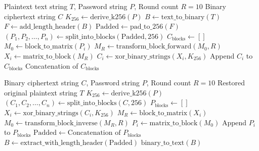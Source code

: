\begin{algorithm}[htbp]
\caption{SHA-512 256-Bit Block CA Encryption Pipeline}
\label{alg:research_encrypt}
\begin{algorithmic}[1]
\REQUIRE Plaintext text string $T$, Password string $P$, Round count $R=10$
\ENSURE Binary ciphertext string $C$
\STATE $K_{256} \leftarrow \text{derive\_k256}(P)$
\STATE $B \leftarrow \text{text\_to\_binary}(T)$
\STATE $F \leftarrow \text{add\_length\_header}(B)$
\STATE $\text{Padded} \leftarrow \text{pad\_to\_256}(F)$
\STATE $(P_1, P_2, \dots, P_n) \leftarrow \text{split\_into\_blocks}(\text{Padded}, 256)$
\STATE $C_{\text{blocks}} \leftarrow []$
    \STATE $M_0 \leftarrow \text{block\_to\_matrix}(P_i)$
    \STATE $M_R \leftarrow \text{transform\_block\_forward}(M_0, R)$
    \STATE $X_i \leftarrow \text{matrix\_to\_block}(M_R)$
    \STATE $C_i \leftarrow \text{xor\_binary\_strings}(X_i, K_{256})$
    \STATE Append $C_i$ to $C_{\text{blocks}}$
\ENDFOR
\RETURN Concatenation of $C_{\text{blocks}}$
\end{algorithmic}
\end{algorithm}

\begin{algorithm}[htbp]
\caption{SHA-512 256-Bit Block CA Decryption Pipeline}
\label{alg:research_decrypt}
\begin{algorithmic}[1]
\REQUIRE Binary ciphertext string $C$, Password string $P$, Round count $R=10$
\ENSURE Restored original plaintext string $T$
\STATE $K_{256} \leftarrow \text{derive\_k256}(P)$
\STATE $(C_1, C_2, \dots, C_n) \leftarrow \text{split\_into\_blocks}(C, 256)$
\STATE $P_{\text{blocks}} \leftarrow []$
    \STATE $X_i \leftarrow \text{xor\_binary\_strings}(C_i, K_{256})$
    \STATE $M_R \leftarrow \text{block\_to\_matrix}(X_i)$
    \STATE $M_0 \leftarrow \text{transform\_block\_inverse}(M_R, R)$
    \STATE $P_i \leftarrow \text{matrix\_to\_block}(M_0)$
    \STATE Append $P_i$ to $P_{\text{blocks}}$
\ENDFOR
\STATE $\text{Padded} \leftarrow \text{Concatenation of } P_{\text{blocks}}$
\STATE $B \leftarrow \text{extract\_with\_length\_header}(\text{Padded})$
\RETURN $\text{binary\_to\_text}(B)$
\end{algorithmic}
\end{algorithm}

